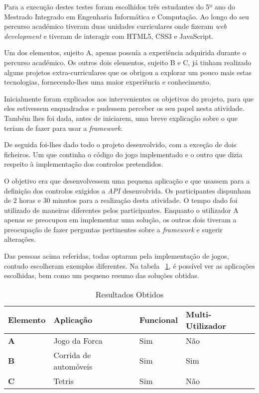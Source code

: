 	Para a execução destes testes foram escolhidos três estudantes do 5º ano do Mestrado Integrado em Engenharia Informática e Computação. Ao longo do seu percurso académico tiveram duas unidades curriculares onde fizeram \textit{web development} e tiveram de interagir com HTML5, CSS3 e JavaScript.

	Um dos elementos, sujeito A, apenas possuía a experiência adquirida durante o percurso académico. Os outros dois elementos, sujeito B e C, já tinham realizado alguns projetos extra-curriculares que os obrigou a explorar um pouco mais estas tecnologias, fornecendo-lhes uma maior experiência e conhecimento. 

	Inicialmente foram explicados aos intervenientes os objetivos do projeto, para que eles estivessem enquadrados e pudessem perceber os seu papel nesta atividade. Também lhes foi dada, antes de iniciarem, uma breve explicação sobre o que teriam de fazer para usar a \textit{framework}.

	De seguida foi-lhes dado todo o projeto desenvolvido, com a exceção de dois ficheiros. Um que continha o código do jogo implementado e o outro que dizia respeito à implementação dos controlos pretendidos.

	O objetivo era que desenvolvessem uma pequena aplicação e que usassem para a definição dos controlos exigidos a \textit{API} desenvolvida. Os participantes dispunham de 2 horas e 30 minutos para a realização desta atividade. O tempo dado foi utilizado de maneiras diferentes pelos participantes. Enquanto o utilizador A apenas se preocupou em implementar uma solução, os outros dois tiveram a preocupação de fazer perguntas pertinentes sobre a \textit{framework} e sugerir alterações.

	Das pessoas acima referidas, todas optaram pela implementação de jogos, contudo escolheram exemplos diferentes. Na tabela ~\ref{table:Resultados}, é possível ver as aplicações escolhidas, bem como um pequeno resumo das soluções obtidas.

	\begin{table}[ht]
	\centering

	\begin{tabular}{ |l|l|l|l| }
	\hline
	\textbf{Elemento} & \textbf{Aplicação} & \textbf{Funcional} & \textbf{Multi-Utilizador} \\ 
	\hline
	\textbf{A} & Jogo da Forca & Sim & Não \\
	\hline
	\textbf{B} & Corrida de automóveis & Sim & Sim \\
	\hline
	\textbf{C} & Tetris & Sim & Não \\
	\hline
	\end{tabular}

	\caption{Resultados Obtidos}
	\label{table:Resultados}
	\end{table}

